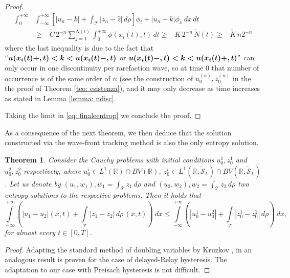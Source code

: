 \documentclass[12pt]{article}
\newcommand{\R}{\mathbb{R}}
\newcommand{\T}{\mathcal{T}}
\newcommand{\p}{\rho}
\newcommand{\1}{\mathds{1}}
\newtheorem{teo}{Theorem}[section]
\theoremstyle{definition}
\begin{document}
\begin{proof}
\begin{equation}
\begin{split}
        \int_{0}^{+\infty} &\int_{-\infty}^{+\infty} \left[|u_n-k|+\int_\T |z_n-\hat{z}|\, d\p\right] \phi_t+|u_n-k|\phi_x \,dx\,dt \\ &\geq - \tilde{C}\, 2^{-n}\sum_{j=1}^{N(t)} \int_0^{+\infty } \phi(x_i(t),t)\,dt \geq - K \, 2^{-n} \, \tilde{N}(t) \geq -\tilde{K} \, n 2^{-n}
    \end{split}
    \end{equation} where the last inequality is due to the fact that  $``\boldsymbol{u(x_i(t)+,t)<k<u(x_i(t)-,t)}$ or
    $\boldsymbol{u(x_i(t)-,t)<k<u(x_i(t)+,t)}"$ can only occur in one discontinuity per rarefaction wave, so at time $0$ that number of occurrence is of the same order of $n$ (see the construction of $u_0^{(n)},z_0^{(n)}$ in the the proof of Theorem \ref{teo: esistenza}), and it may only decrease as time increases as stated in Lemma \ref{lemma: ndisc}. \par
    Taking the limit in \eqref{eq: finaleentrop} we conclude the proof. 
\end{proof}

As a consequence of the next theorem, we then deduce that the solution constructed via the wave-front tracking method is also the only entropy solution. 


\begin{teo}
    Consider the Cauchy problems with initial conditions $u_0^1,z_0^1$ and $u_0^2,z_0^2$ respectively, where $u_0^i\in L^1(\R)\cap BV(\R)$, $z_0^i \in L^1(\R;\tilde{\mathcal S}_L)\cap BV(\R; \tilde{\mathcal S}_L) $. Let us denote by $(u_1,w_1), w_1=\int_\T z_1\, d\p$ and $(u_2,w_2), w_2=\int_\T z_2\,d\p$ two entropy solutions to the respective problems. Then it holds that \begin{equation}
        \int\limits_{-\infty}^{+\infty} (|u_1-u_2|(x,t)+\int\limits_\T|z_1-z_2|\,d\p\,(x,t))~dx \leq \int\limits_{-\infty}^{+\infty}(|u_0^1-u_0^2|+\int\limits_\T|z_0^1-z_0^2|\,d\p)~dx, 
    \end{equation} for almost every $t\in [0,T]$.
\end{teo}

\begin{proof}
    Adapting the standard method of doubling variables by Kruzkov \cite{Krukov}, in \cite{AVH1} an analogous result is proven for the case of delayed-Relay hysteresis. The adaptation to our case with Preisach hysteresis is not difficult. 
\end{proof}

\end{document}
